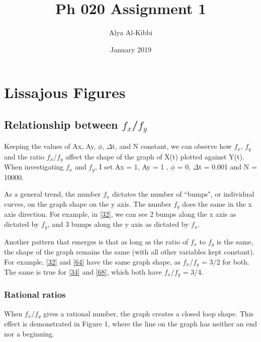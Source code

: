 \documentclass{article}
\title{Ph 020 Assignment 1}
\author{Alya Al-Kibbi}
\date{January 2019}
\begin{document}
\maketitle

\section{Lissajous Figures}

\subsection{Relationship between $f_x$/$f_y$}

Keeping the values of Ax, Ay, $\phi$, $\Delta$t, and N constant, we can observe how $f_x$, $f_y$ and the ratio $f_x$/$f_y$ affect the shape of the graph of X(t) plotted against Y(t). When investigating $f_x$ and $f_y$, I set Ax = 1, Ay = 1 , $\phi$ = 0, $\Delta$t = 0.001 and N = 10000. 

As a general trend, the number $f_x$ dictates the number of ``bumps", or individual curves, on the graph shape on the y axis. The number $f_y$ does the same in the x axis direction. For example, in \ref{32}, we can see 2 bumps along the x axis as dictated by $f_y$, and 3 bumps along the y axis as dictated by $f_x$.

Another pattern that emerges is that as long as the ratio of $f_x$ to $f_y$ is the same, the shape of the graph remains the same (with all other variables kept constant). For example, \ref{32} and \ref{64} have the same graph shape, as $f_x$/$f_y$ = 3/2 for both. The same is true for \ref{34} and \ref{68}, which both have $f_x$/$f_y$ = 3/4. 

\subsubsection{Rational ratios}

When $f_x$/$f_y$ gives a rational number, the graph creates a closed loop shape. This effect is demonstrated in Figure 1, where the line on the graph has neither an end nor a beginning. 
\end{document}
